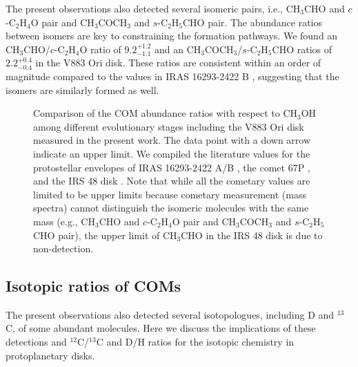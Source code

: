 \documentclass[linenumbers, twocolumn, twocolappendix, astrosymb, times]{aastex631}
\newcommand{\methanol}{CH$_3$OH\xspace}
\newcommand{\acetaldehyde}{CH$_3$CHO\xspace}
\newcommand{\acetone}{CH$_3$COCH$_3$\xspace}
\newcommand{\ethyleneoxide}{$c$-C$_2$H$_4$O\xspace}
\newcommand{\propenal}{$t$-C$_2$H$_3$CHO\xspace}
\newcommand{\propanal}{$s$-C$_2$H$_5$CHO\xspace}
\begin{document}
The present observations also detected several isomeric pairs, i.e., \acetaldehyde and \ethyleneoxide pair and \acetone and \propanal pair. The abundance ratios between isomers are key to constraining the formation pathways. We found an \acetaldehyde/\ethyleneoxide ratio of $9.2_{-1.1}^{+1.2}$ and an \acetone/\propanal ratios of $2.2_{-0.4}^{+0.4}$ in the V883 Ori disk. These ratios are consistent within an order of magnitude compared to the values in IRAS 16293-2422 B \citep{Lykke2017}, suggesting that the isomers are similarly formed as well.  






\begin{figure}
\caption{Comparison of the COM abundance ratios with respect to \methanol among different evolutionary stages including the V883 Ori disk measured in the present work. The data point with a down arrow indicate an upper limit. We compiled the literature values for the protostellar envelopes of IRAS 16293-2422 A/B \citep{Lykke2017, Jorgensen2018, Manigand2020, Manigand2021}, the comet 67P \citep{Rubin2019, Schuhmann2019}, and the IRS 48 disk \citep{Brunken2022}. Note that while all the cometary values are limited to be upper limits because cometary measurement (mass spectra) cannot distinguish the isomeric molecules with the same mass (e.g., \acetaldehyde and \ethyleneoxide pair and \acetone and \propanal pair), the upper limit of \acetaldehyde in the IRS 48 disk is due to non-detection.}
\label{fig:ratio_comparison}
\end{figure}


\subsection{Isotopic ratios of COMs}
The present observations also detected several isotopologues, including D and $^{13}$C, of some abundant molecules. Here we discuss the implications of these detections and $^{12}$C/$^{13}$C and D/H ratios for the isotopic chemistry in protoplanetary disks. 
\end{document}
